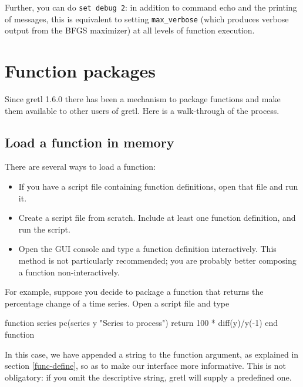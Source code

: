 Further, you can do \texttt{set debug 2}: in addition to command echo
and the printing of messages, this is equivalent to setting
\verb|max_verbose| (which produces verbose output from the BFGS
maximizer) at all levels of function execution.

\section{Function packages}
\label{sec:func-packages}

Since gretl 1.6.0 there has been a mechanism to package
functions and make them available to other users of gretl.  Here
is a walk-through of the process.

\subsection{Load a function in memory}

There are several ways to load a function:

\begin{itemize}
\item If you have a script file containing function definitions, open
  that file and run it.
\item Create a script file from scratch.  Include at least one
  function definition, and run the script.
\item Open the GUI console and type a function definition
  interactively.  This method is not particularly recommended; you are
  probably better composing a function non-interactively.
\end{itemize}

For example, suppose you decide to package a function that returns the
percentage change of a time series. Open a script file and type
\begin{code}
function series pc(series y "Series to process")
  return 100 * diff(y)/y(-1)
end function
\end{code}
In this case, we have appended a string to the function argument, as
explained in section \ref{func-define}, so as to make our interface
more informative.  This is not obligatory: if you omit the descriptive
string, gretl will supply a predefined one.

